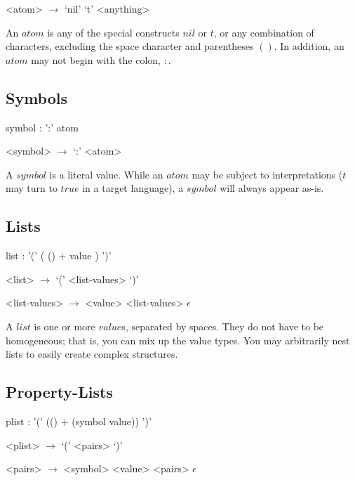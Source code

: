 \documentclass[a4paper]{article}
\begin{document}
\begin{grammar}
	<atom> $\to$ `nil'
		\alt `t'
		\alt <anything>
\end{grammar}

An $atom$ is any of the special constructs $nil$ or $t$, or any combination of characters, excluding the space character and parentheses $()$. In addition, an $atom$ may not begin with the colon, $:$.

\subsection{Symbols}
\begin{rail}
	symbol : ':' atom
\end{rail}

\begin{grammar}
	<symbol> $\to$ `:' <atom>
\end{grammar}

A $symbol$ is a literal value. While an $atom$ may be subject to interpretations ($t$ may turn to $true$ in a target language), a $symbol$ will always appear as-is.

\subsection{Lists}
\begin{rail}
	list : '(' ( () + value ) ')'
\end{rail}

\begin{grammar}
	<list> $\to$ `(' <list-values> `)'

	<list-values> $\to$ <value> <list-values>
		\alt $\epsilon$
\end{grammar}

A $list$ is one or more $value$s, separated by spaces. They do not have to be homogeneous; that is, you can mix up the value types. You may arbitrarily nest lists to easily create complex structures.


\subsection{Property-Lists}
\begin{rail}
	plist : '(' (() + (symbol value)) ')'
\end{rail}

\begin{grammar}
	<plist> $\to$ `(' <pairs> `)'

	<pairs> $\to$ <symbol> <value> <pairs>
		\alt $\epsilon$
\end{grammar}
\end{document}
